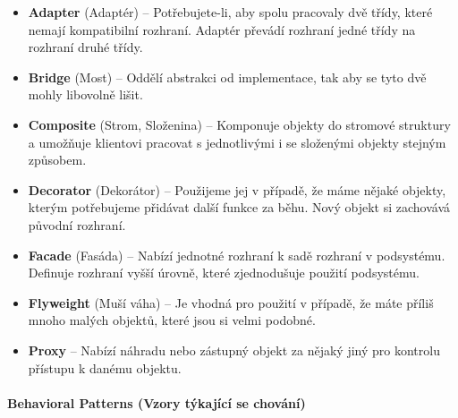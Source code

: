 \documentclass[10pt,a4paper]{article}
\begin{document}
\begin{itemize}
\item \textbf{Adapter} (Adaptér) – Potřebujete-li, aby spolu pracovaly dvě třídy, které nemají kompatibilní rozhraní. Adaptér převádí rozhraní jedné třídy na rozhraní druhé třídy.
\item \textbf{Bridge} (Most) – Oddělí abstrakci od implementace, tak aby se tyto dvě mohly libovolně lišit.
\item \textbf{Composite} (Strom, Složenina) – Komponuje objekty do stromové struktury a umožňuje klientovi pracovat s jednotlivými i se složenými objekty stejným způsobem.
\item \textbf{Decorator} (Dekorátor) – Použijeme jej v případě, že máme nějaké objekty, kterým potřebujeme přidávat další funkce za běhu. Nový objekt si zachovává původní rozhraní.
\item \textbf{Facade} (Fasáda) – Nabízí jednotné rozhraní k sadě rozhraní v podsystému. Definuje rozhraní vyšší úrovně, které zjednodušuje použití podsystému.
\item \textbf{Flyweight} (Muší váha) – Je vhodná pro použití v případě, že máte příliš mnoho malých objektů, které jsou si velmi podobné.
\item \textbf{Proxy} – Nabízí náhradu nebo zástupný objekt za nějaký jiný pro kontrolu přístupu k danému objektu.
\end{itemize}


\paragraph{Behavioral Patterns (Vzory týkající se chování)}
\end{document}
